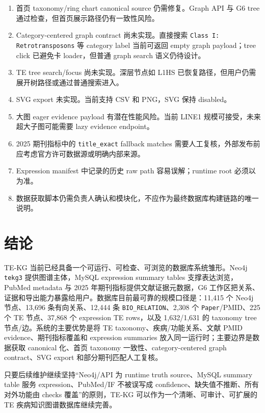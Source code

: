 \documentclass[12pt,a4paper,UTF8]{ctexart}
\newcommand{\code}[1]{\texttt{#1}}
\newcommand{\sourcefile}[1]{\path{#1}}
\begin{document}
\begin{enumerate}
  \item 首页 taxonomy/ring chart canonical source 仍需修复。Graph API 与 G6 tree 通过检查，但首页展示路径仍有一致性风险。
  \item Category-centered graph contract 尚未实现。直接搜索 \code{Class I: Retrotransposons} 等 category label 当前可返回 empty graph payload；tree click 已避免卡 loader，但普通 graph search 语义仍待设计。
  \item TE tree search/focus 尚未实现。深层节点如 L1HS 已恢复路径，但用户仍需展开树路径或通过普通搜索进入。
  \item SVG export 未实现。当前支持 CSV 和 PNG，SVG 保持 disabled。
  \item 大图 eager evidence payload 有潜在性能风险。当前 LINE1 规模可接受，未来超大子图可能需要 lazy evidence endpoint。
  \item 2025 期刊指标中的 \code{title\_exact} fallback matches 需要人工复核，外部发布前应考虑官方许可数据源或明确内部来源。
  \item Expression manifest 中记录的历史 raw path 容易误解；runtime root 必须以 \sourcefile{data/bulk_expression_web} 为准。
  \item 数据获取脚本仍需负责人确认和模块化，不应作为最终数据库构建链路的唯一说明。
\end{enumerate}

\section{结论}

TE-KG 当前已经具备一个可运行、可检查、可浏览的数据库系统雏形。Neo4j \code{tekg3} 提供图谱主体，MySQL expression summary tables 支撑表达浏览，PubMed metadata 与 2025 年期刊指标提供文献证据元数据，G6 工作区把关系、证据和导出能力暴露给用户。数据库目前最可靠的规模口径是：11,415 个 Neo4j 节点、13,696 条有向关系、12,444 条 \code{BIO\_RELATION}、2,308 个 \code{Paper}/PMID、225 个 TE 节点、37,868 个 expression TE rows，以及 1,632/1,631 的 taxonomy tree 节点/边。系统的主要优势是将 TE taxonomy、疾病/功能关系、文献 PMID evidence、期刊指标覆盖和 expression summaries 放入同一运行时；主要边界是数据获取 canonical 化、首页 taxonomy 一致性、category-centered graph contract、SVG export 和部分期刊匹配人工复核。

只要后续维护继续坚持“Neo4j/API 为 runtime truth source、MySQL summary table 服务 expression、PubMed/IF 不被误写成 confidence、缺失值不推断、所有对外功能由 checks 覆盖”的原则，TE-KG 可以作为一个清晰、可审计、可扩展的 TE 疾病知识图谱数据库继续完善。

\end{document}
